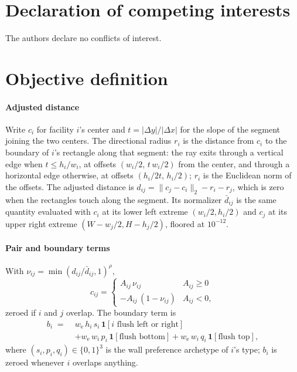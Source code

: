 \documentclass[preprint,12pt,authoryear,nonatbib]{elsarticle}
\begin{document}
\section*{Declaration of competing interests}
The authors declare no conflicts of interest.

\appendix
\section{Objective definition}
\label{app:objective}
\paragraph{Adjusted distance}
Write $c_i$ for facility $i$'s center and $t=|\Delta y|/|\Delta x|$ for the
slope of the segment joining the two centers. The directional radius $r_i$ is
the distance from $c_i$ to the boundary of $i$'s rectangle along that segment:
the ray exits through a vertical edge when $t\le h_i/w_i$, at offsets
$(w_i/2,\,t\,w_i/2)$ from the center, and through a horizontal edge otherwise,
at offsets $(h_i/2t,\,h_i/2)$; $r_i$ is the Euclidean norm of the offsets. The
adjusted distance is $d_{ij}=\lVert c_j-c_i\rVert_2-r_i-r_j$, which is zero
when the rectangles touch along the segment. Its normalizer $\bar d_{ij}$ is
the same quantity evaluated with $c_i$ at its lower left extreme
$(w_i/2,h_i/2)$ and $c_j$ at its upper right extreme $(W-w_j/2,H-h_j/2)$,
floored at $10^{-12}$.

\paragraph{Pair and boundary terms}
With $\nu_{ij}=\min(d_{ij}/\bar d_{ij},1)^{\rho}$,
\[
c_{ij}=\begin{cases}A_{ij}\,\nu_{ij} & A_{ij}\ge 0\\ -A_{ij}\,(1-\nu_{ij}) & A_{ij}<0,\end{cases}
\]
zeroed if $i$ and $j$ overlap. The boundary term is
\begin{align*}
b_i \;=\;& w_{\mathrm e}\,h_i\,s_i\,\mathbf 1[\text{$i$ flush left or right}]\\
 &+ w_{\mathrm e}\,w_i\,p_i\,\mathbf 1[\text{flush bottom}]
  + w_{\mathrm e}\,w_i\,q_i\,\mathbf 1[\text{flush top}],
\end{align*}
where $(s_i,p_i,q_i)\in\{0,1\}^3$ is the wall preference archetype of $i$'s
type; $b_i$ is zeroed whenever $i$ overlaps anything.
\end{document}
